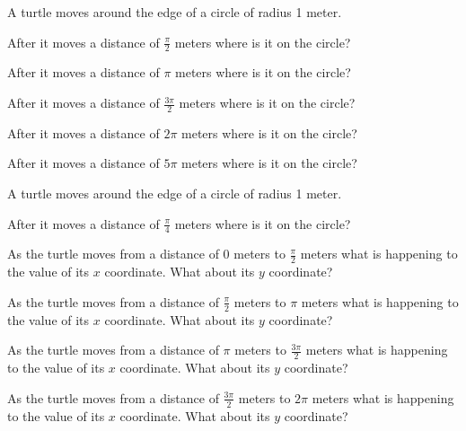 \begin{problem}
  \item A turtle moves around the edge of a circle of radius 1 meter.
    \begin{subproblem}
      \item After it moves a distance of $\frac{\pi}{2}$ meters where is it on the circle?
      \vfill
      \item After it moves a distance of $\pi$ meters where is it on the circle?
      \vfill
      \item After it moves a distance of $\frac{3\pi}{2}$ meters where is it on the circle?
      \vfill
      \item After it moves a distance of $2\pi$ meters where is it on the circle?
      \vfill
      \item After it moves a distance of $5\pi$ meters where is it on the circle?
      \vfill
    \end{subproblem}

\clearpage

\item A turtle moves around the edge of a circle of radius 1 meter.
  \begin{subproblem}
    \item After it moves a distance of $\frac{\pi}{4}$ meters where is it on the circle?
    \vfill
    \item As the turtle moves from a distance of 0 meters to $\frac{\pi}{2}$ meters
      what is happening to the value of its $x$ coordinate. What about
      its $y$ coordinate?
    \vfill
    \item As the turtle moves from a distance of $\frac{\pi}{2}$ meters to $\pi$ meters
      what is happening to the value of its $x$ coordinate. What about its $y$ coordinate?
    \vfill
    \item As the turtle moves from a distance of $\pi$ meters to $\frac{3\pi}{2}$ meters
      what is happening to the value of its $x$ coordinate. What about its $y$ coordinate?
    \vfill
    \item As the turtle moves from a distance of $\frac{3\pi}{2}$ meters to $2\pi$ meters
      what is happening to the value of its $x$ coordinate. What about its $y$ coordinate?
    \vfill
  \end{subproblem}


\end{problem}
